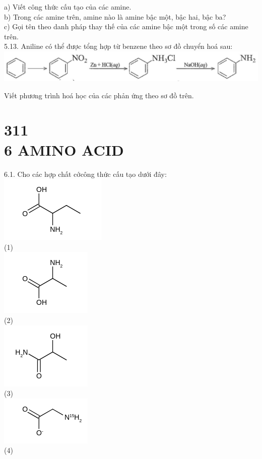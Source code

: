 \documentclass[10pt]{article}
\begin{document}
a) Viết công thức cấu tạo của các amine.\\
b) Trong các amine trên, amine nào là amine bậc một, bậc hai, bậc ba?\\
c) Gọi tên theo danh pháp thay thế của các amine bậc một trong số các amine trên.\\
5.13. Aniline có thể được tổng hợp từ benzene theo sơ đồ chuyển hoá sau:\\
\includegraphics[max width=\textwidth, center]{2025_10_23_80c1361fcdcd395cad8eg-18}

Viết phương trình hoá học của các phản ứng theo sơ đồ trên.

\section*{311 \\
 6 AMINO ACID}
6.1. Cho các hợp chất cớcông thức cấu tạo dưới đây:\\
\includegraphics{smile-ce9e107623c4f6533182e192faf7704e6b49d5d0}\\
(1)\\
\includegraphics{smile-78e0b1cf0ee2c5260eadab7356b4644d14cf33b4}\\
(2)\\
\includegraphics{smile-25199bebebe91f9def116b1be3d2b7f303d7c668}\\
(3)\\
\includegraphics{smile-4c3a3eed75e33356ae6d0435650dfe31e8907c8e}\\
(4)
\end{document}
